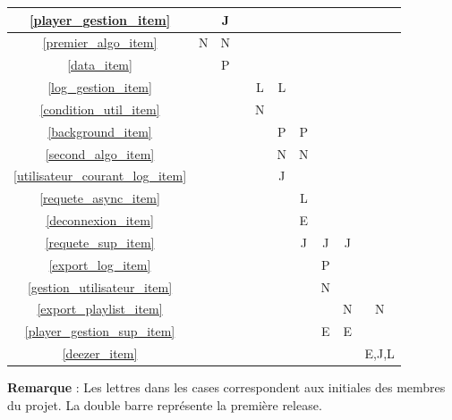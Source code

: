\documentclass{article}
\begin{document}
\begin{center}
\begin{tabular}{|*{3}{c|}|*{7}{c|}}
			\hline
			\ref{player_gestion_item}                &   & J &   &   &    &    &    &    &       \\
			\hline
			\ref{premier_algo_item}                  & N & N &   &   &    &    &    &    &       \\
			\hline
			\ref{data_item}                          &   & P &   &   &    &    &    &    &       \\
			\hline
			\ref{log_gestion_item}                   &   &   &   & L & L  &    &    &    &       \\
			\hline
			\ref{condition_util_item}                &   &   &   & N &    &    &    &    &       \\
			\hline
			\ref{background_item}                    &   &   &   &   & P  & P  &    &    &       \\
			\hline
			\ref{second_algo_item}                   &   &   &   &   & N  & N  &    &    &       \\
			\hline
			\ref{utilisateur_courant_log_item}       &   &   &   &   & J  &    &    &    &       \\
			\hline
			\ref{requete_async_item}                 &   &   &   &   &    & L  &    &    &       \\
			\hline
			\ref{deconnexion_item}                   &   &   &   &   &    & E  &    &    &       \\
			\hline
			\ref{requete_sup_item}                   &   &   &   &   &    & J  & J  & J  &       \\
			\hline
			\ref{export_log_item}                    &   &   &   &   &    &    & P  &    &       \\
			\hline
			\ref{gestion_utilisateur_item}           &   &   &   &   &    &    & N  &    &       \\       
			\hline
			\ref{export_playlist_item}               &   &   &   &   &    &    &    & N  & N     \\ 
			\hline
			\ref{player_gestion_sup_item}            &   &   &   &   &    &    & E  & E  &       \\         
			\hline
			\ref{deezer_item}                        &   &   &   &   &    &    &    &    & E,J,L \\   
			\hline
									
		\end{tabular}
		\end{center}
		\textbf{Remarque} : Les lettres dans les cases correspondent aux initiales des membres du projet. La double barre représente la première release.
						
\end{document}
